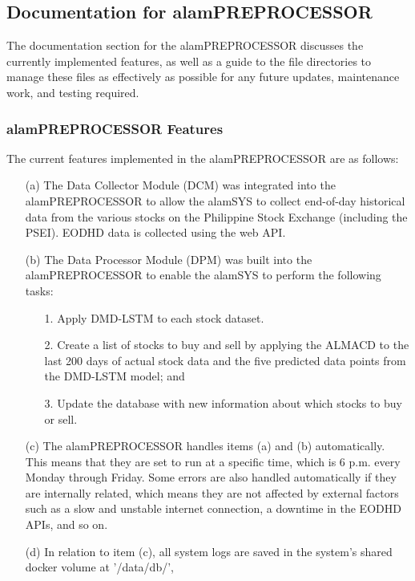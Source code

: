 \subsection{Documentation for alamPREPROCESSOR}
\label{subsec:doc_preproc}
The documentation section for the alamPREPROCESSOR discusses the currently implemented features, 
as well as a guide to the file directories to manage these files as effectively as possible for 
any future updates, maintenance work, and testing required.

\subsubsection{alamPREPROCESSOR Features}
\label{subsubsec:alamPREPROCESSOR_features}
The current features implemented in the alamPREPROCESSOR are as follows:
\begin{itemize}
    \item[(a)] The Data Collector Module (DCM) was integrated into the alamPREPROCESSOR 
    to allow the alamSYS to collect end-of-day historical data from the various stocks on 
    the Philippine Stock Exchange (including the PSEI). EODHD data is collected using the web API.
    \item[(b)] The Data Processor Module (DPM) was built into the alamPREPROCESSOR to enable the 
    alamSYS to perform the following tasks:
    \begin{itemize}
        \item[1.] Apply DMD-LSTM to each stock dataset.
        \item[2.] Create a list of stocks to buy and sell by applying the ALMACD to the last 200 
        days of actual stock data and the five predicted data points from the DMD-LSTM model; and
        \item[3.] Update the database with new information about which stocks to buy or sell.
    \end{itemize}
    \item[(c)] The alamPREPROCESSOR handles items (a) and (b) automatically. 
    This means that they are set to run at a specific time, which is 6 p.m. every Monday through Friday. 
    Some errors are also handled automatically if they are internally related, which means they are not affected 
    by external factors such as a slow and unstable internet connection, a downtime in the EODHD APIs, and so on.
    \item[(d)] In relation to item (c), all system logs are saved in the system's shared docker volume at '/data/db/', 

\end{itemize}
